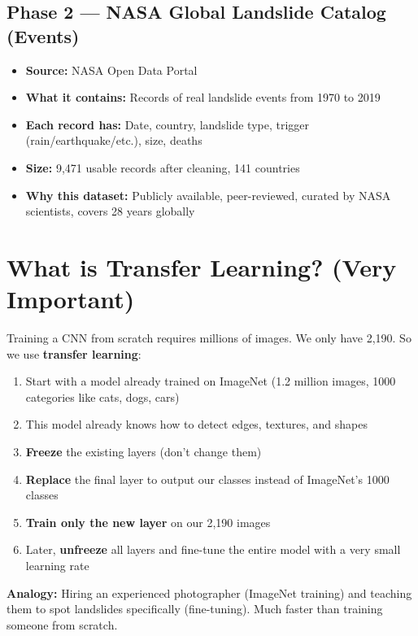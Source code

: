 \documentclass[11pt]{article}
\begin{document}
\subsection{Phase 2 --- NASA Global Landslide Catalog (Events)}

\begin{itemize}[noitemsep]
    \item \textbf{Source:} NASA Open Data Portal
    \item \textbf{What it contains:} Records of real landslide events from 1970 to 2019
    \item \textbf{Each record has:} Date, country, landslide type, trigger (rain/earthquake/etc.), size, deaths
    \item \textbf{Size:} 9,471 usable records after cleaning, 141 countries
    \item \textbf{Why this dataset:} Publicly available, peer-reviewed, curated by NASA scientists, covers 28 years globally
\end{itemize}

\section{What is Transfer Learning? (Very Important)}

Training a CNN from scratch requires millions of images. We only have 2,190. So we use \textbf{transfer learning}:

\begin{enumerate}[noitemsep]
    \item Start with a model already trained on ImageNet (1.2 million images, 1000 categories like cats, dogs, cars)
    \item This model already knows how to detect edges, textures, and shapes
    \item \textbf{Freeze} the existing layers (don't change them)
    \item \textbf{Replace} the final layer to output our classes instead of ImageNet's 1000 classes
    \item \textbf{Train only the new layer} on our 2,190 images
    \item Later, \textbf{unfreeze} all layers and fine-tune the entire model with a very small learning rate
\end{enumerate}

\textbf{Analogy:} Hiring an experienced photographer (ImageNet training) and teaching them to spot landslides specifically (fine-tuning). Much faster than training someone from scratch.
\end{document}
